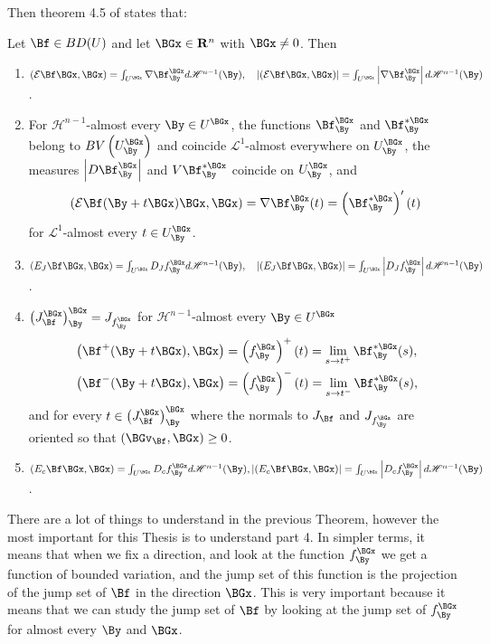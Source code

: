 Then theorem 4.5 of \cite{Ambrosio1997} states that:
\begin{theorem}
Let $\Bf \in B D(U)$ and let $\BGx \in \mathbf{R}^n$ with $\BGx \neq 0$. Then
\begin{enumerate}
\item $\left( \CE \Bf \BGx, \BGx\right)=\int_{U^{\BGx}} \nabla \Bf_\By^{\BGx} d \mathscr{H}^{n-1}(\By),\quad\left|\left(\CE \Bf \BGx, \BGx\right)\right|=\int_{U^{\BGx}}\left|\nabla \Bf_\By^{\BGx}\right| d \mathscr{H}^{n-1}(\By)$.

\item For $\mathscr{H}^{n-1}$-almost every $\By \in U^{\BGx}$, the functions $\Bf_\By^\BGx$ and $\Bf_\By^{*\BGx}$ belong to $B V\left(U_\By^{\BGx}\right)$ and coincide $\mathscr{L}^1$-almost everywhere on $U_\By^{\BGx}$, the measures $\left|D \Bf_\By^{\BGx}\right|$ and $V \Bf_\By^{*\BGx}$ coincide on $U_\By^{\BGx}$, and $$(\CE \Bf(\By+t \BGx) \BGx, \BGx)=\nabla \Bf_\By^{\BGx}(t)=\left(\Bf_\By^{*\BGx}\right)^{\prime}(t)$$ for $\mathscr{L}^1$-almost every $t \in U_\By^{\BGx}$.
\item $\left(E_J \Bf \BGx, \BGx\right)=\int_{U^{\BGx}} D_J f_\By^{\BGx} d \mathscr{H}^{n-1}(\By), \quad\left|\left(E_J \Bf \BGx, \BGx\right)\right|=\int_{U^{\BGx}}\left|D_J f_\By^{\BGx}\right| d \mathscr{H}^{n-1}(\By)$.

\item $\left(J_\Bf^{\BGx}\right)_\By^{\BGx}=J_{f_\By^{\BGx}}$ for $\mathscr{H}^{n-1}$-almost every $\By \in U^{\BGx}$
$$
\begin{aligned}
&\left(\Bf^{+}(\By+t \BGx), \BGx\right)=\left(f_\By^{\BGx}\right)^{+}(t)=\lim _{s \rightarrow t^{+}} \Bf_\By^{*\BGx}(s), \\
&\left(\Bf^{-}(\By+t \BGx), \BGx\right)=\left(f_\By^{\BGx}\right)^{-}(t)=\lim _{s \rightarrow t^{-}} \Bf_\By^{*\BGx}(s),
\end{aligned}
$$
and for every $t \in\left(J_\Bf^{\BGx}\right)_\By^{\BGx}$ where the normals to $J_\Bf$ and $J_{f_\By^{\BGx}}$ are oriented so that $\left(\BGv_\Bf, \BGx\right) \geq 0$.
\item $\left(E_c \Bf \BGx, \BGx\right)=\int_{U^{\BGx}} D_c f_\By^{\BGx} d \mathscr{H}^{n-1}(\By),\left|\left(E_c \Bf \BGx, \BGx\right)\right|=\int_{U^{\BGx}}\left|D_c f_\By^{\BGx}\right| d \mathscr{H}^{n-1}(\By)$.
\end{enumerate}
\end{theorem}
There are a lot of things to understand in the previous Theorem, however the most important for this Thesis is to understand part 4. In simpler terms, it means that when we fix a direction, and look at the function $f_\By^\BGx$ we get a function of bounded variation, and the jump set of this function is the projection of the jump set of $\Bf$ in the direction $\BGx$. This is very important because it means that we can study the jump set of $\Bf$ by looking at the jump set of $f_\By^\BGx$ for almost every $\By$ and $\BGx$. 

